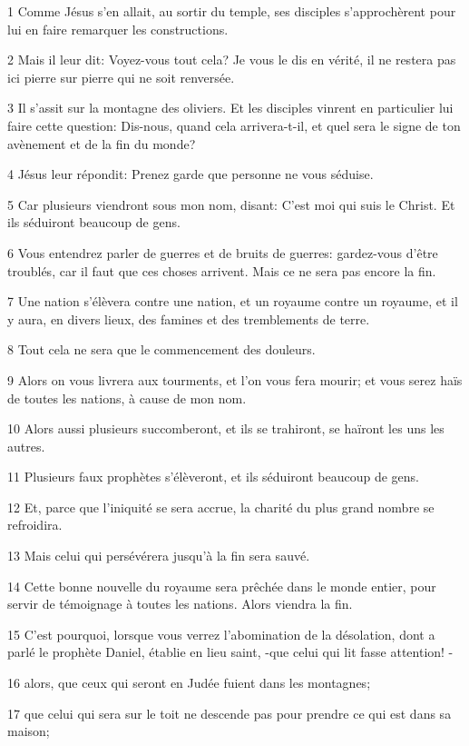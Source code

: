 \par 1 Comme Jésus s'en allait, au sortir du temple, ses disciples s'approchèrent pour lui en faire remarquer les constructions.
\par 2 Mais il leur dit: Voyez-vous tout cela? Je vous le dis en vérité, il ne restera pas ici pierre sur pierre qui ne soit renversée.
\par 3 Il s'assit sur la montagne des oliviers. Et les disciples vinrent en particulier lui faire cette question: Dis-nous, quand cela arrivera-t-il, et quel sera le signe de ton avènement et de la fin du monde?
\par 4 Jésus leur répondit: Prenez garde que personne ne vous séduise.
\par 5 Car plusieurs viendront sous mon nom, disant: C'est moi qui suis le Christ. Et ils séduiront beaucoup de gens.
\par 6 Vous entendrez parler de guerres et de bruits de guerres: gardez-vous d'être troublés, car il faut que ces choses arrivent. Mais ce ne sera pas encore la fin.
\par 7 Une nation s'élèvera contre une nation, et un royaume contre un royaume, et il y aura, en divers lieux, des famines et des tremblements de terre.
\par 8 Tout cela ne sera que le commencement des douleurs.
\par 9 Alors on vous livrera aux tourments, et l'on vous fera mourir; et vous serez haïs de toutes les nations, à cause de mon nom.
\par 10 Alors aussi plusieurs succomberont, et ils se trahiront, se haïront les uns les autres.
\par 11 Plusieurs faux prophètes s'élèveront, et ils séduiront beaucoup de gens.
\par 12 Et, parce que l'iniquité se sera accrue, la charité du plus grand nombre se refroidira.
\par 13 Mais celui qui persévérera jusqu'à la fin sera sauvé.
\par 14 Cette bonne nouvelle du royaume sera prêchée dans le monde entier, pour servir de témoignage à toutes les nations. Alors viendra la fin.
\par 15 C'est pourquoi, lorsque vous verrez l'abomination de la désolation, dont a parlé le prophète Daniel, établie en lieu saint, -que celui qui lit fasse attention! -
\par 16 alors, que ceux qui seront en Judée fuient dans les montagnes;
\par 17 que celui qui sera sur le toit ne descende pas pour prendre ce qui est dans sa maison;
